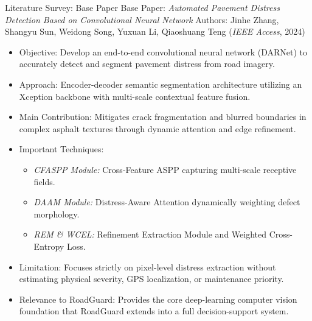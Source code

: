 \documentclass[10pt]{beamer}
\def\\{}%
\def\textbf#1{#1}%
\def\begin#1{}%
\def\end#1{}%
\def\vspace#1{}%
\begin{document}
\begin{frame}{Literature Survey: Base Paper}
    \textbf{Base Paper:} \textit{Automated Pavement Distress Detection Based on Convolutional Neural Network} \\
    \textbf{Authors:} Jinhe Zhang, Shangyu Sun, Weidong Song, Yuxuan Li, Qiaoshuang Teng (\textit{IEEE Access}, 2024)
    \vspace{0.4em}
    \begin{itemize}
        \setlength{\itemsep}{0.45em}
        \item \textbf{Objective:} Develop an end-to-end convolutional neural network (DARNet) to accurately detect and segment pavement distress from road imagery.
        \item \textbf{Approach:} Encoder-decoder semantic segmentation architecture utilizing an Xception backbone with multi-scale contextual feature fusion.
        \item \textbf{Main Contribution:} Mitigates crack fragmentation and blurred boundaries in complex asphalt textures through dynamic attention and edge refinement.
        \item \textbf{Important Techniques:}
        \begin{itemize}
            \item \textit{CFASPP Module:} Cross-Feature ASPP capturing multi-scale receptive fields.
            \item \textit{DAAM Module:} Distress-Aware Attention dynamically weighting defect morphology.
            \item \textit{REM \& WCEL:} Refinement Extraction Module and Weighted Cross-Entropy Loss.
        \end{itemize}
        \item \textbf{Limitation:} Focuses strictly on pixel-level distress extraction without estimating physical severity, GPS localization, or maintenance priority.
        \item \textbf{Relevance to RoadGuard:} Provides the core deep-learning computer vision foundation that RoadGuard extends into a full decision-support system.
    \end{itemize}
\end{frame}
\end{document}
